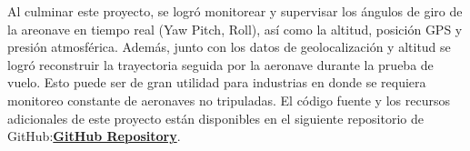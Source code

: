 Al culminar este proyecto, se logró monitorear y supervisar los ángulos de giro de la areonave en tiempo real (Yaw Pitch, Roll), así como la altitud, posición GPS y presión atmosférica. Además, junto con los datos de geolocalización y altitud se logró reconstruir la trayectoria seguida por la aeronave durante la prueba de vuelo. Esto puede ser de gran utilidad para industrias en donde se requiera monitoreo constante de aeronaves no tripuladas. El código fuente y los recursos adicionales de este proyecto están disponibles en el siguiente repositorio de GitHub:\href{https://github.com/YesidAlmanzaGamba/Thesis-Flight-Controller-Fixed-Wing}{\textbf{GitHub Repository}}.



